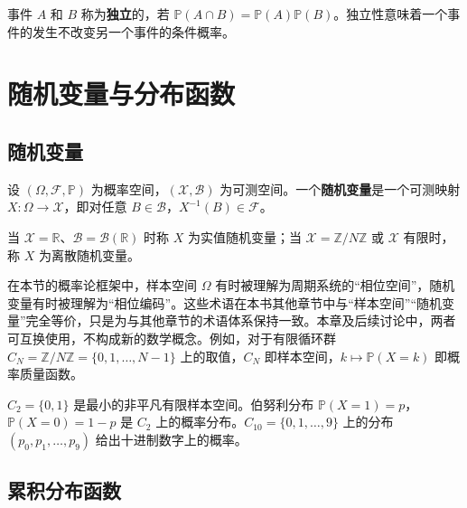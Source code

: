 \begin{definition}[事件的独立性]\label{def:independence}
事件 $A$ 和 $B$ 称为\textbf{独立}的，若 $\mathbb{P}(A \cap B) = \mathbb{P}(A)\mathbb{P}(B)$。独立性意味着一个事件的发生不改变另一个事件的条件概率。
\end{definition}

\section{随机变量与分布函数}\label{sec:random_variables}

\subsection{随机变量}

\begin{definition}[随机变量]\label{def:random_variable}
设 $(\Omega, \mathcal{F}, \mathbb{P})$ 为概率空间，$(\mathcal{X}, \mathcal{B})$ 为可测空间。一个\textbf{随机变量}是一个可测映射 $X: \Omega \to \mathcal{X}$，即对任意 $B \in \mathcal{B}$，$X^{-1}(B) \in \mathcal{F}$。

当 $\mathcal{X} = \mathbb{R}$、$\mathcal{B} = \mathcal{B}(\mathbb{R})$ 时称 $X$ 为实值随机变量；当 $\mathcal{X} = \mathbb{Z}/N\mathbb{Z}$ 或 $\mathcal{X}$ 有限时，称 $X$ 为离散随机变量。
\end{definition}

\begin{remark}\label{rem:phase_terminology_usage}
在本节的概率论框架中，样本空间 $\Omega$ 有时被理解为周期系统的“相位空间”，随机变量有时被理解为“相位编码”。这些术语在本书其他章节中与“样本空间”“随机变量”完全等价，只是为与其他章节的术语体系保持一致。本章及后续讨论中，两者可互换使用，不构成新的数学概念。例如，对于有限循环群 $C_N = \mathbb{Z}/N\mathbb{Z} = \{0, 1, \dots, N-1\}$ 上的取值，$C_N$ 即样本空间，$k \mapsto \mathbb{P}(X = k)$ 即概率质量函数。
\end{remark}

\begin{example}[有限样本空间的基本实例]\label{ex:finite_sample_space}
$C_2 = \{0, 1\}$ 是最小的非平凡有限样本空间。伯努利分布 $\mathbb{P}(X=1) = p$，$\mathbb{P}(X=0) = 1-p$ 是 $C_2$ 上的概率分布。$C_{10} = \{0, 1, \dots, 9\}$ 上的分布 $(p_0, p_1, \dots, p_9)$ 给出十进制数字上的概率。
\end{example}

\subsection{累积分布函数}

